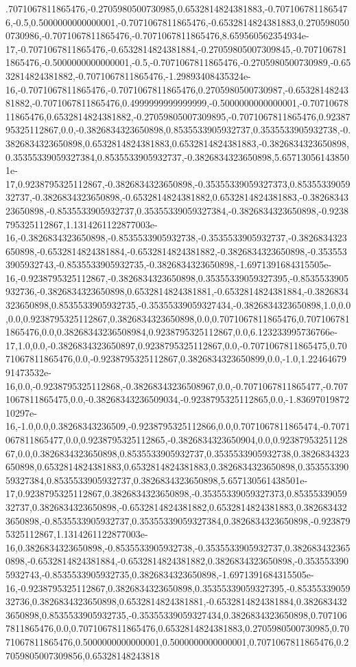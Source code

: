 .7071067811865476,-0.2705980500730985,0.6532814824381883,-0.7071067811865476,-0.5,0.5000000000000001,-0.7071067811865476,-0.6532814824381883,0.2705980500730986,-0.7071067811865476,-0.7071067811865476,8.659560562354934e-17,-0.7071067811865476,-0.6532814824381884,-0.27059805007309845,-0.7071067811865476,-0.5000000000000001,-0.5,-0.7071067811865476,-0.2705980500730989,-0.6532814824381882,-0.7071067811865476,-1.29893408435324e-16,-0.7071067811865476,-0.7071067811865476,0.2705980500730987,-0.6532814824381882,-0.7071067811865476,0.4999999999999999,-0.5000000000000001,-0.7071067811865476,0.6532814824381882,-0.27059805007309895,-0.7071067811865476,0.9238795325112867,0.0,-0.3826834323650898,0.8535533905932737,0.3535533905932738,-0.3826834323650898,0.6532814824381883,0.6532814824381883,-0.3826834323650898,0.35355339059327384,0.8535533905932737,-0.3826834323650898,5.657130561438501e-17,0.9238795325112867,-0.3826834323650898,-0.35355339059327373,0.8535533905932737,-0.3826834323650898,-0.6532814824381882,0.6532814824381883,-0.3826834323650898,-0.8535533905932737,0.35355339059327384,-0.3826834323650898,-0.9238795325112867,1.1314261122877003e-16,-0.3826834323650898,-0.8535533905932738,-0.3535533905932737,-0.3826834323650898,-0.6532814824381884,-0.6532814824381882,-0.3826834323650898,-0.3535533905932743,-0.8535533905932735,-0.3826834323650898,-1.6971391684315505e-16,-0.9238795325112867,-0.3826834323650898,0.35355339059327395,-0.8535533905932736,-0.3826834323650898,0.6532814824381881,-0.6532814824381884,-0.3826834323650898,0.8535533905932735,-0.35355339059327434,-0.3826834323650898,1.0,0.0,0.0,0.9238795325112867,0.3826834323650898,0.0,0.7071067811865476,0.7071067811865476,0.0,0.38268343236508984,0.9238795325112867,0.0,6.123233995736766e-17,1.0,0.0,-0.3826834323650897,0.9238795325112867,0.0,-0.7071067811865475,0.7071067811865476,0.0,-0.9238795325112867,0.3826834323650899,0.0,-1.0,1.2246467991473532e-16,0.0,-0.9238795325112868,-0.38268343236508967,0.0,-0.7071067811865477,-0.7071067811865475,0.0,-0.38268343236509034,-0.9238795325112865,0.0,-1.8369701987210297e-16,-1.0,0.0,0.38268343236509,-0.9238795325112866,0.0,0.7071067811865474,-0.7071067811865477,0.0,0.9238795325112865,-0.3826834323650904,0.0,0.9238795325112867,0.0,0.3826834323650898,0.8535533905932737,0.3535533905932738,0.3826834323650898,0.6532814824381883,0.6532814824381883,0.3826834323650898,0.35355339059327384,0.8535533905932737,0.3826834323650898,5.657130561438501e-17,0.9238795325112867,0.3826834323650898,-0.35355339059327373,0.8535533905932737,0.3826834323650898,-0.6532814824381882,0.6532814824381883,0.3826834323650898,-0.8535533905932737,0.35355339059327384,0.3826834323650898,-0.9238795325112867,1.1314261122877003e-16,0.3826834323650898,-0.8535533905932738,-0.3535533905932737,0.3826834323650898,-0.6532814824381884,-0.6532814824381882,0.3826834323650898,-0.3535533905932743,-0.8535533905932735,0.3826834323650898,-1.6971391684315505e-16,-0.9238795325112867,0.3826834323650898,0.35355339059327395,-0.8535533905932736,0.3826834323650898,0.6532814824381881,-0.6532814824381884,0.3826834323650898,0.8535533905932735,-0.35355339059327434,0.3826834323650898,0.7071067811865476,0.0,0.7071067811865476,0.6532814824381883,0.2705980500730985,0.7071067811865476,0.5000000000000001,0.5000000000000001,0.7071067811865476,0.27059805007309856,0.65328148243818